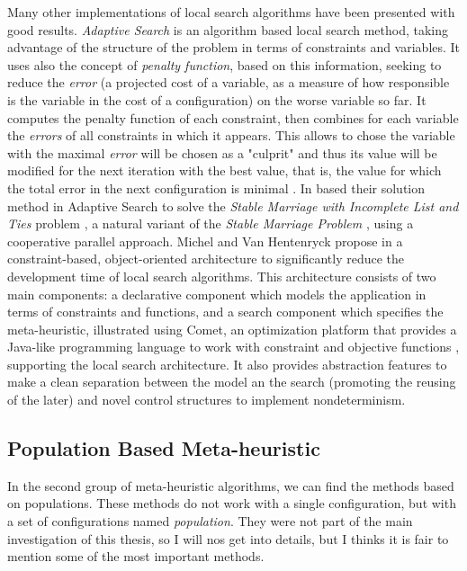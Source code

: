 Many other implementations of local search algorithms have been presented with good results. {\it Adaptive Search} is an algorithm based local search method, taking advantage of the structure of the problem in terms of constraints and variables. It uses also the concept of \textit{penalty function}, based on this information, seeking to reduce the \textit{error} (a projected cost of a variable, as a measure of how responsible is the variable in the cost of a configuration) on the worse variable so far. It computes the penalty function of each constraint, then combines for each variable the \textit{errors} of all constraints in which it appears. This allows to chose the variable with the maximal \textit{error} will be chosen as a "culprit" and thus its value will be modified for the next iteration with the best value, that is, the value for which the total error in the next configuration is minimal \cite{Diaz, Codognet2001, Caniou14}. In \cite{Munera2015}  based their solution method in Adaptive Search to solve the \textit{Stable Marriage with Incomplete List and Ties} problem \cite{Iwama1999}, a natural variant of the \textit{Stable Marriage Problem} \cite{Gale1962}, using a cooperative parallel approach. Michel and Van Hentenryck propose in \cite{Michel2002} a constraint-based, object-oriented architecture to significantly reduce the development time of local search algorithms. This architecture consists of two main components: a declarative component which models the application in terms of constraints and functions, and a search component which specifies the meta-heuristic, illustrated using {\sc Comet}, an optimization platform that provides a Java-like programming language to work with constraint and objective functions \cite{Comet, Michel2005}, supporting the local search architecture. It also provides abstraction features to make a clean separation between the model an the search (promoting the reusing of the later) and novel control structures to implement nondeterminism.

\subsection{Population Based Meta-heuristic}

In the second group of meta-heuristic algorithms, we can find the methods based on populations. These methods do not work with a single configuration, but with a set of configurations named {\it population}. They were not part of the main investigation of this thesis, so I will nos get into details, but I thinks it is fair to mention some of the most important methods.

